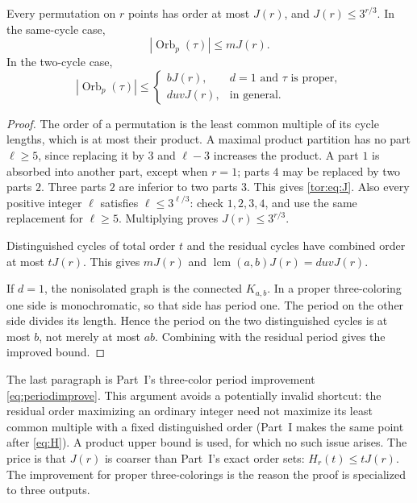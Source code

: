 \documentclass[11pt,a4paper]{article}
\numberwithin{equation}{section}
\theoremstyle{definition}
\theoremstyle{remark}
\newcommand{\lcm}{\operatorname{lcm}}
\newcommand{\Orb}{\operatorname{Orb}}
\begin{document}
\begin{lemma}\label{tor:lem:product}
Every permutation on $r$ points has order at most $J(r)$, and
$J(r)\le3^{r/3}$. In the same-cycle case,
\begin{equation}\label{tor:eq:sameperiod}
 |\Orb_p(\tau)|\le mJ(r).
\end{equation}
In the two-cycle case,
\begin{equation}\label{tor:eq:crossperiod}
 |\Orb_p(\tau)|\le
 \begin{cases}
 bJ(r),&d=1\text{ and }\tau\text{ is proper},\\
 duvJ(r),&\text{in general}.
 \end{cases}
\end{equation}
\end{lemma}
\begin{proof}
The order of a permutation is the least common multiple of its cycle lengths,
which is at most their product. A maximal product partition has no part
$\ell\ge5$, since replacing it by $3$ and $\ell-3$ increases the product. A
part $1$ is absorbed into another part, except when $r=1$; parts $4$ may be
replaced by two parts $2$. Three parts $2$ are inferior to two parts $3$.
This gives \eqref{tor:eq:J}. Also every positive integer $\ell$ satisfies
$\ell\le3^{\ell/3}$: check $1,2,3,4$, and use the same replacement for
$\ell\ge5$. Multiplying proves $J(r)\le3^{r/3}$.

Distinguished cycles of total order $t$ and the residual cycles have combined
order at most $tJ(r)$. This gives $mJ(r)$ and $\lcm(a,b)J(r)=duvJ(r)$.

If $d=1$, the nonisolated graph is the connected $K_{a,b}$. In a proper
three-coloring one side is monochromatic, so that side has period one. The
period on the other side divides its length. Hence the period on the two
distinguished cycles is at most $b$, not merely at most $ab$. Combining with
the residual period gives the improved bound.
\end{proof}

The last paragraph is Part~I's three-color period improvement
\eqref{eq:periodimprove}. This argument avoids a potentially invalid shortcut:
the residual order maximizing an ordinary integer need not maximize its least
common multiple with a fixed distinguished order (Part~I makes the same point
after \eqref{eq:H}). A product upper bound is used, for which no such issue
arises. The price is that $J(r)$ is coarser than Part~I's exact order sets:
$H_r(t)\le tJ(r)$. The improvement for proper three-colorings is the reason
the proof is specialized to three outputs.
\end{document}
